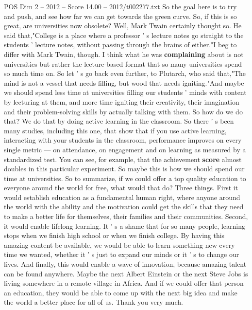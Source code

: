 \begin{textsample}{POS Dim 2 – 2012 – Score 14.00 – 2012/t002277.txt}
So the goal here is to try and push, and see how far we can get towards the green curve.
So, if this is so great, are universities now obsolete?
Well, Mark Twain certainly thought so.
He said that,"College is a place where a professor ' s lecture notes go straight to the students ' lecture notes, without passing through the brains of either."I beg to differ with Mark Twain, though.
I think what he was \textbf{complaining} about is not universities but rather the lecture-based format that so many universities spend so much time on.
So let ' s go back even further, to Plutarch, who said that,"The mind is not a vessel that needs filling, but wood that needs igniting."And maybe we should spend less time at universities filling our students ' minds with content by lecturing at them, and more time igniting their creativity, their imagination and their problem-solving skills by actually talking with them.
So how do we do that?
We do that by doing active learning in the classroom.
So there ' s been many studies, including this one, that show that if you use active learning, interacting with your students in the classroom, performance improves on every single metric — on attendance, on engagement and on learning as measured by a standardized test.
You can see, for example, that the achievement \textbf{score} almost doubles in this particular experiment.
So maybe this is how we should spend our time at universities.
So to summarize, if we could offer a top quality education to everyone around the world for free, what would that do?
Three things.
First it would establish education as a fundamental human right, where anyone around the world with the ability and the motivation could get the skills that they need to make a better life for themselves, their families and their communities.
Second, it would enable lifelong learning.
It ' s a shame that for so many people, learning stops when we finish high school or when we finish college.
By having this amazing content be available, we would be able to learn something new every time we wanted, whether it ' s just to expand our minds or it ' s to change our lives.
And finally, this would enable a wave of innovation, because amazing talent can be found anywhere.
Maybe the next Albert Einstein or the next Steve Jobs is living somewhere in a remote village in Africa.
And if we could offer that person an education, they would be able to come up with the next big idea and make the world a better place for all of us.
Thank you very much.

\end{textsample}
